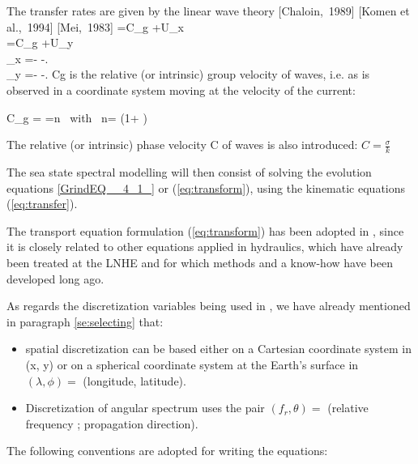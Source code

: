  The transfer rates are given by the linear wave theory [Chaloin,~1989] [Komen et al.,~1994] [Mei,~1983] \cite{Tolman1991}
\bequ
\label{eq:transfer}
\dsp
{}=C_{g}  +U_{x} \\[6pt]
\dsp
{}=C_{g}  +U_{y} \\[6pt]
\dsp
{}_{x} =-  -. \\[6pt]
\dsp
{}_{y} =-  -.
\earr 
\eequ
 Cg is the relative (or intrinsic) group velocity of waves, i.e. as is observed in a coordinate system moving at the velocity of the current:

\bequ
\label{eq:cg4_8}
C_{g} = =n \mbox{ with } n= \left(1+ \right)
\eequ

 The relative (or intrinsic) phase velocity C of waves is also introduced:  $C=\frac{\sigma }{k} $

 The sea state spectral modelling will then consist of solving the evolution equations \eqref{GrindEQ__4_1_} or (\ref{eq:transform}), using the kinematic equations (\ref{eq:transfer}).

 The transport equation formulation (\ref{eq:transform}) has been adopted in \tomawac, since it is closely related to other equations applied in hydraulics, which have already been treated at the LNHE and for which methods and a know-how have been developed long ago.

 As regards the discretization variables being used in \tomawac, we have already mentioned in paragraph \ref{se:selecting} that:

 \begin{itemize}
\item spatial discretization can be based either on a Cartesian coordinate system in (x, y) or on a spherical coordinate system at the Earth's surface in $(\lambda, \phi) =$ (longitude, latitude).
 \item Discretization of angular spectrum uses the pair $(f_r, \theta) =$ (relative frequency ; propagation direction).
\end{itemize}

 The following conventions are adopted for writing the equations:

